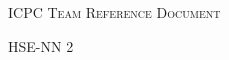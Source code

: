 \documentclass[a4paper]{article}
\begin{document}
	\thispagestyle{fancy}
	
	\begin{center}
		\Huge\textsc{ICPC Team Reference Document}
		
		\huge HSE-NN 2
		
		\vspace{0.50cm}
	\end{center}
	
	\begin{multicols*}{2}
		\tableofcontents
		
		\setcounter{page}{1}
	\end{multicols*}
	\enlargethispage*{\baselineskip}
	\pagebreak
	
	
	\setcounter{page}{2}
\end{document}
